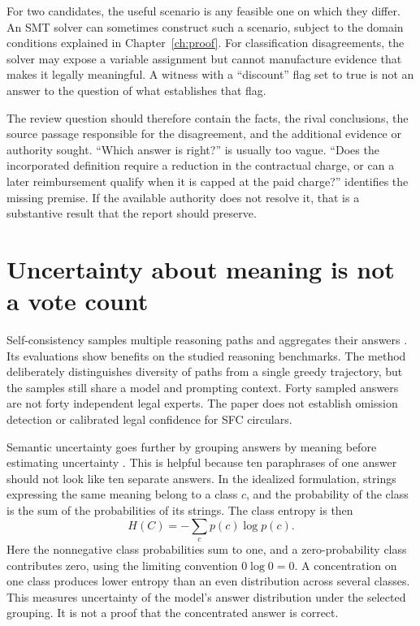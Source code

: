 For two candidates, the useful scenario is any feasible one on which they differ.
An SMT solver can sometimes construct such a scenario, subject to the domain
conditions explained in Chapter~\ref{ch:proof}. For classification disagreements,
the solver may expose a variable assignment but cannot manufacture evidence that
makes it legally meaningful. A witness with a ``discount'' flag set to true is not
an answer to the question of what establishes that flag.

The review question should therefore contain the facts, the rival conclusions,
the source passage responsible for the disagreement, and the additional evidence
or authority sought. ``Which answer is right?'' is usually too vague. ``Does the
incorporated definition require a reduction in the contractual charge, or can a
later reimbursement qualify when it is capped at the paid charge?'' identifies
the missing premise. If the available authority does not resolve it, that is a
substantive result that the report should preserve.

\section{Uncertainty about meaning is not a vote count}
\label{merge:M05:09}


Self-consistency samples multiple reasoning paths and aggregates their answers
\citep[section 2]{selfconsistency2023}. Its evaluations show benefits on the
studied reasoning benchmarks. The method deliberately distinguishes diversity of
paths from a single greedy trajectory, but the samples still share a model and
prompting context. Forty sampled answers are not forty independent legal experts.
The paper does not establish omission detection or calibrated legal confidence
for SFC circulars.

Semantic uncertainty goes further by grouping answers by meaning before
estimating uncertainty \citep[sections 3--4]{semantic2023}. This is helpful because
ten paraphrases of one answer should not look like ten separate answers. In the
idealized formulation, strings expressing the same meaning belong to a class
$c$, and the probability of the class is the sum of the probabilities of its
strings. The class entropy is then
\begin{equation}
 H(C)=-\sum_c p(c)\log p(c).
 \label{eq:semantic-entropy}
\end{equation}
Here the nonnegative class probabilities sum to one, and a zero-probability
class contributes zero, using the limiting convention $0\log 0=0$.
A concentration on one class produces lower entropy than an even distribution
across several classes. This measures uncertainty of the model's answer
distribution under the selected grouping. It is not a proof that the concentrated
answer is correct.

